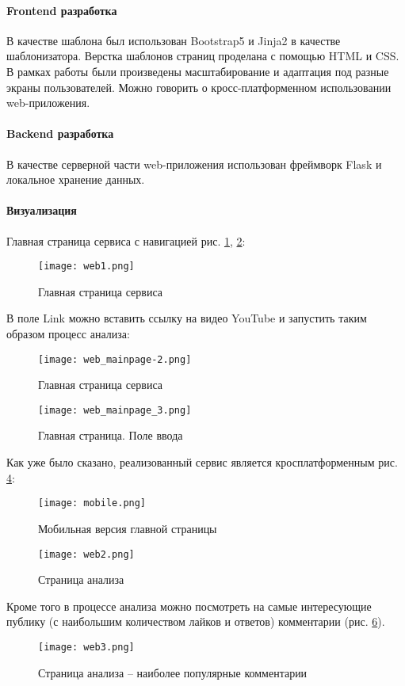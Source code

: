 \paragraph{Frontend разработка}
В качестве шаблона был использован Bootstrap5 и Jinja2 в качестве шаблонизатора. Верстка шаблонов страниц проделана с помощью HTML и CSS. В рамках работы были произведены масштабирование и адаптация под разные экраны пользователей. Можно говорить о кросс-платформенном использовании web-приложения.
\paragraph{Backend разработка}
В качестве серверной части web-приложения использован фреймворк Flask и локальное хранение данных.
\paragraph{Визуализация}
Главная страница сервиса с навигацией рис. \ref{fig:web1}, \ref{fig:web2}:
\begin{figure}[H]
    \centering
    \texttt{[image: web1.png]}
    \caption{Главная страница сервиса}
    \label{fig:web1}
\end{figure}
В поле Link можно вставить ссылку на видео YouTube и запустить таким образом процесс анализа: 
\begin{figure}[H]
    \centering
    \texttt{[image: web\_mainpage-2.png]}
    \caption{Главная страница сервиса}
    \label{fig:web2}
\end{figure}
\begin{figure}[H]
    \centering
    \texttt{[image: web\_mainpage\_3.png]}
    \caption{Главная страница. Поле ввода}
    \label{fig:web3}
\end{figure}
Как уже было сказано, реализованный сервис является кросплатформенным рис. \ref{fig:mobile}:
\begin{figure}[H]
    \centering
    \texttt{[image: mobile.png]}
    \caption{Мобильная версия главной страницы}
    \label{fig:mobile}
\end{figure}
\begin{figure}[H]
    \centering
    \texttt{[image: web2.png]}
    \caption{Страница анализа}
    \label{fig:web_analysis}
\end{figure}
Кроме того в процессе анализа можно посмотреть на самые интересующие публику (с наибольшим количеством лайков и ответов) комментарии (рис. \ref{fig:web_analysis2}).
\begin{figure}[H]
    \centering
    \texttt{[image: web3.png]}
    \caption{Страница анализа -- наиболее популярные комментарии}
    \label{fig:web_analysis2}
\end{figure}
